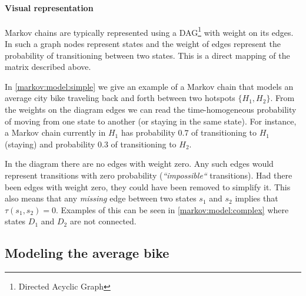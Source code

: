 \paragraph{Visual representation}
Markov chains are typically represented using a DAG\footnote{Directed Acyclic Graph} with weight on its edges.
In such a graph nodes represent states and the weight of edges represent the probability of transitioning between two states.
This is a direct mapping of the matrix described above.

In \cref{markov:model:simple} we give an example of a Markov chain that models an average city bike traveling back and forth between two hotspots $\{H_1, H_2\}$.
From the weights on the diagram edges we can read the time-homogeneous probability of moving from one state to another (or staying in the same state).
For instance, a Markov chain currently in $H_1$ has probability $0.7$ of transitioning to $H_1$ (staying) and probability $0.3$ of transitioning to $H_2$.

In the diagram there are no edges with weight zero.
Any such edges would represent transitions with zero probability (\textit{``impossible``} transitions).
Had there been edges with weight zero, they could have been removed to simplify it.
This also means that any \textit{missing} edge between two states $s_1$ and $s_2$ implies that $\tau(s_1, s_2) = 0$.
Examples of this can be seen in \cref{markov:model:complex} where states $D_1$ and $D_2$ are not connected.

\subsection{Modeling the average bike}\label{markov:modeling}



